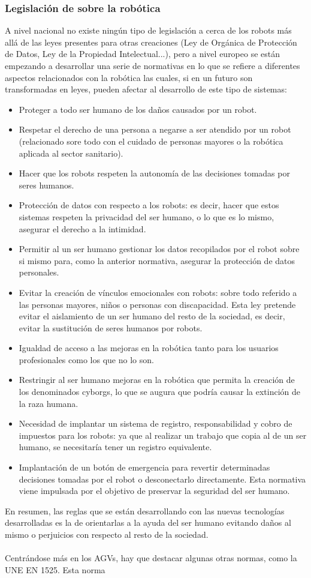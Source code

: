 \subsubsection{Legislación de sobre la robótica}
A nivel nacional no existe ningún tipo de legislación a cerca de los robots más allá de las leyes presentes para otras creaciones (Ley de Orgánica de Protección de Datos, Ley de la Propiedad Intelectual...), pero a nivel europeo se están empezando a desarrollar una serie de normativas en lo que se refiere a diferentes aspectos relacionados con la robótica las cuales, si en un futuro son transformadas en leyes, pueden afectar al desarrollo de este tipo de sistemas:
\begin{itemize}
	\item Proteger a todo ser humano de los daños causados por un robot.
	\item Respetar el derecho de una persona a negarse a ser atendido por un robot (relacionado sore todo con el cuidado de personas mayores o la robótica aplicada al sector sanitario).
	\item Hacer que los robots respeten la autonomía de las decisiones tomadas por seres humanos.
	\item Protección de datos con respecto a los robots: es decir, hacer que estos sistemas respeten la privacidad del ser humano, o lo que es lo mismo, asegurar el derecho a la intimidad.
	\item Permitir al un ser humano gestionar los datos recopilados por el robot sobre si mismo para, como la anterior normativa, asegurar la protección de datos personales.
	\item Evitar la creación de vínculos emocionales con robots: sobre todo referido a las personas mayores, niños o personas con discapacidad. Esta ley pretende evitar el aislamiento de un ser humano del resto de la sociedad, es decir, evitar la sustitución de seres humanos por robots.
	\item Igualdad de acceso a las mejoras en la robótica tanto para los usuarios profesionales como los que no lo son.
	\item Restringir al ser humano mejoras en la robótica que permita la creación de los denominados cyborgs, lo que se augura que podría causar la extinción de la raza humana.
	\item Necesidad de implantar un sistema de registro, responsabilidad y cobro de impuestos para los robots: ya que al realizar un trabajo que copia al de un ser humano, se necesitaría tener un registro equivalente.
	\item Implantación de un botón de emergencia para revertir determinadas decisiones tomadas por el robot o desconectarlo directamente. Esta normativa viene impulsada por el objetivo de preservar la seguridad del ser humano.
\end{itemize}
En resumen, las reglas que se están desarrollando con las nuevas tecnologías desarrolladas es la de orientarlas a la ayuda del ser humano evitando daños al mismo o perjuicios con respecto al resto de la sociedad.\\
\\
Centrándose más en los AGVs, hay que destacar algunas otras normas, como la UNE EN 1525. Esta norma 